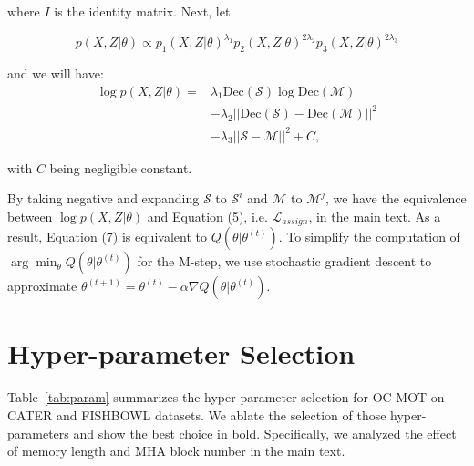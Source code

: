 \documentclass[10pt,twocolumn,letterpaper]{article}
\begin{document}
\begin{appendices}
\noindent where $I$ is the identity matrix. Next, let

\begin{equation}
    p(X, Z|\theta) \propto p_1(X, Z|\theta)^{\lambda_1} p_2(X, Z|\theta)^{2\lambda_2} p_3(X, Z|\theta)^{2\lambda_3}
\end{equation}

\noindent and we will have:
\begin{align}
    \log p(X, Z|\theta) = & \lambda_1 \text{Dec}(\mathcal{S}) \log \text{Dec}(\mathcal{M}) \\
    & - \lambda_2 ||\text{Dec}(\mathcal{S}) - \text{Dec}(\mathcal{M})||^2 \\
    & - \lambda_3 ||\mathcal{S} - \mathcal{M}||^2 + C,
\end{align}

\noindent with $C$ being negligible constant.

By taking negative and expanding $\mathcal{S}$ to $\mathcal{S}^i$ and $\mathcal{M}$ to $\mathcal{M}^j$, we have the equivalence between $\log p(X, Z|\theta)$ and Equation (5), i.e. $\mathcal{L}_{assign}$, in the main text. As a result, Equation (7) is equivalent to $Q(\theta|\theta^{(t)})$.
To simplify the computation of $\arg\min_\theta Q(\theta|\theta^{(t)})$ for the M-step, we use stochastic gradient descent to approximate $\theta^{(t+1)} = \theta^{(t)} - \alpha \nabla Q(\theta|\theta^{(t)})$.
\section{Hyper-parameter Selection}
Table~\ref{tab:param} summarizes the hyper-parameter selection for OC-MOT on CATER and FISHBOWL datasets. We ablate the selection of those hyper-parameters and show the best choice in bold. Specifically, we analyzed the effect of memory length and MHA block number in the main text.
\begin{table}[!ht]
	\centering
{}
\vspace{+0.05in}
\caption{\textbf{Hyper-parameter selection for OC-MOT}. The best selections are marked in bold. }
	\label{tab:param}
\end{table} 


\end{appendices}
\end{document}
